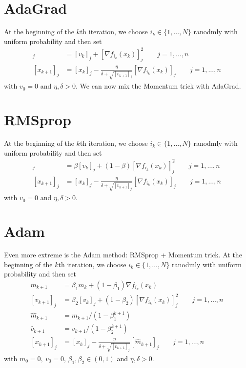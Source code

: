 \documentclass[12pt, openany]{report}
\theoremstyle{definition}
\begin{document}
\section{AdaGrad}
At the beginning of the $k$th iteration, we choose $i_k\in \{1,\dots,N\}$ ranodmly with uniform probability and then set 
\begin{align}
    [v_{k+1}]_j &= [v_k]_j + [\nabla f_{i_k}(x_k)]_j^2 \qquad j = 1,\dots, n\nonumber \\
    [x_{k+1}]_j &= [x_k]_j - \frac{\eta}{\delta + \sqrt{[v_{k+1}]_j}}[\nabla f_{i_k}(x_k)]_j\qquad j=1,\dots, n
\end{align}
with $v_0=0$ and $\eta, \delta >0$.
We can now mix the Momentum trick with AdaGrad.
\section{RMSprop}
At the beginning of the $k$th iteration, we choose $i_k\in \{1,\dots,N\}$ ranodmly with uniform probability and then set 
\begin{align}
    [v_{k+1}]_j &= \beta[v_k]_j + (1-\beta)[\nabla f_{i_k}(x_k)]_j^2 \qquad j = 1,\dots, n\nonumber \\
    [x_{k+1}]_j &= [x_k]_j - \frac{\eta}{\delta + \sqrt{[v_{k+1}]_j}}[\nabla f_{i_k}(x_k)]_j\qquad j=1,\dots, n
\end{align}
with $v_0=0$ and $\eta, \delta >0$.
\section{Adam}
Even more extreme is the Adam method: RMSprop + Momentum trick.
At the beginning of the $k$th iteration, we choose $i_k\in \{1,\dots,N\}$ ranodmly with uniform probability and then set 
\begin{align}
    m_{k+1} &= \beta_1m_k + (1-\beta_1)\nabla f_{i_k}(x_k)\nonumber \\
    [v_{k+1}]_j &= \beta_2[v_k]_j + (1-\beta_2)[\nabla f_{i_k}(x_k)]_j^2 \qquad j = 1,\dots, n\nonumber \\
    \hat m_{k+1} &= m_{k+1}/\left(1-\beta_1^{k+1}\right)\\
    \hat v_{k+1} &= v_{k+1}/\left(1-\beta_2^{k+1}\right)\nonumber \\
    [x_{k+1}]_j &= [x_k]_j - \frac{\eta}{\delta + \sqrt{[v_{k+1}]_j}}[\hat m_{k+1}]_j\qquad j=1,\dots, n\nonumber 
\end{align}
with $m_0=0, \: v_0=0$, $\beta_1,\beta_2\in (0,1)$ and $\eta, \delta >0$.
\end{document}
